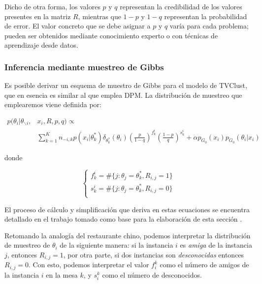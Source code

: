 Dicho de otra forma, los valores $p$ y $q$ representan la credibilidad de los valores presentes en la matriz $R$, mientras que $1 - p$ y $1 - q$ representan la probabilidad de error. El valor concreto que se debe asignar a $p$ y $q$ varía para cada problema; pueden ser obtenidos mediante conocimiento experto o con técnicas de aprendizaje desde datos.

\subsubsection{Inferencia mediante muestreo de Gibbs}

Es posible derivar un esquema de muestro de Gibbs para el modelo de \acs{TVClust}, que en esencia es similar al que emplea \acf{DPM}. La distribución de muestreo que emplearemos viene definida por:

\begin{equation}
\begin{split}
p(\theta_i | \theta_{\backslash i}, & x_i, R, p, q) \varpropto \\
 &\sum_{k = 1}^{K} n_{-i,k} p(x_i|\theta_{k}^*) \delta_{\theta_{k}^*}(\theta_{i}) \left(\frac{p}{1-q}\right)^{f_{k}^i} \left(\frac{1-p}{q}\right)^{s_{k}^i} + \alpha p_{G_0}(x_i)p_{G_0}(\theta_i | x_i)
\end{split}
\label{eqn51}
\end{equation}

donde 

\begin{equation}
\begin{cases}
f_{k}^i = \#\{j:\theta_j = \theta_{k}^*, R_{i,j} = 1\}\\
s_{k}^i = \#\{j:\theta_j = \theta_{k}^*, R_{i,j} = 0\}\\
\end{cases}
\label{eqn52}
\end{equation}

El proceso de cálculo y simplificación que deriva en estas ecuaciones se encuentra detallado en el trabajo tomado como base para la elaboración de esta sección \cite{RDPM:2015}.

Retomando la analogía del restaurante chino, podemos interpretar la distribución de muestreo de $\theta_i$ de la siguiente manera: si la instancia $i$ es \textit{amiga} de la instancia $j$, entonces $R_{i,j} = 1$, por otra parte, si dos instancias son \textit{desconocidas} entonces $R_{i,j} = 0$. Con esto, podemos interpretar el valor $f_{i}^k$ como el número de amigos de la instancia $i$ en la mesa $k$, y $s_{i}^k$ como el número de desconocidos.


